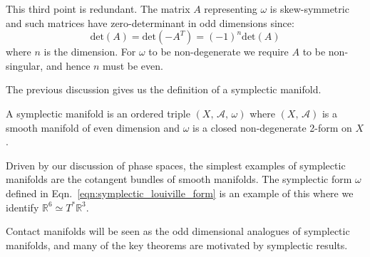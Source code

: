 This third point is redundant. The matrix $A$ representing $\omega$ is
skew-symmetric and such matrices have zero-determinant in odd dimensions
since:
\begin{equation}
    \textrm{det}(A)=\textrm{det}(-A^{T})=(-1)^{n}\textrm{det}(A)
\end{equation}
where $n$ is the dimension. For $\omega$ to be non-degenerate we require $A$
to be non-singular, and hence $n$ must be even.
\par\hfill\par
The previous discussion gives us the definition of a symplectic manifold.
\begin{definition}
    A symplectic manifold is an ordered triple $(X,\,\mathcal{A},\,\omega)$
    where $(X,\,\mathcal{A})$ is a smooth manifold of even dimension and
    $\omega$ is a closed non-degenerate 2-form on $X$.
\end{definition}
Driven by our discussion of phase spaces, the simplest examples of symplectic
manifolds are the cotangent bundles of smooth manifolds. The symplectic form
$\omega$ defined in Eqn.~\ref{eqn:symplectic_louiville_form} is an example
of this where we identify $\mathbb{R}^{6}\simeq{T}^{*}\mathbb{R}^{3}$.
\par\hfill\par
Contact manifolds will be seen as the odd dimensional analogues of symplectic
manifolds, and many of the key theorems are motivated by symplectic results.

